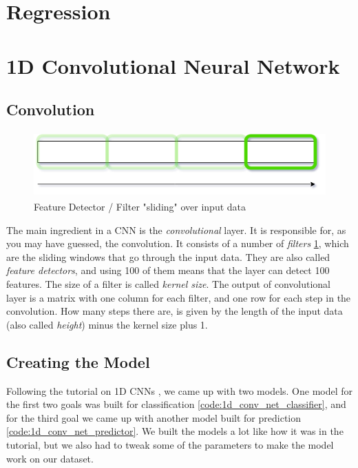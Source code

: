 \section{Regression}



\section{1D Convolutional Neural Network}

\subsection{Convolution}
\begin{figure}
    \includegraphics[height=2.5cm]{img/feature_detector.png}
    \caption{Feature Detector / Filter "sliding" over input data}
    \label{figure:feature_detector}
\end{figure}

The main ingredient in a CNN is the \textit{convolutional} layer. It is responsible for, as you may have guessed, the convolution.
It consists of a number of \textit{filters} \ref{figure:feature_detector}, which are the sliding windows that go through the input data. 
They are also called \textit{feature detectors}, and using 100 of them means that the layer can detect 100 features. 
The size of a filter is called \textit{kernel size}. The output of convolutional layer is a matrix with one column for each filter, and one row for each step
in the convolution. How many steps there are, is given by the length of the input data (also called \textit{height}) minus the kernel size plus 1.


\subsection{Creating the Model}
Following the tutorial on 1D CNNs \cite{1d_cnn}, we came up with two models. 
One model for the first two goals was built for classification \ref{code:1d_conv_net_classifier}, and for the third goal we came up with another model built for 
prediction \ref{code:1d_conv_net_predictor}. We built the models a lot like how it was in the tutorial, 
but we also had to tweak some of the parameters to make the model work on our dataset.

